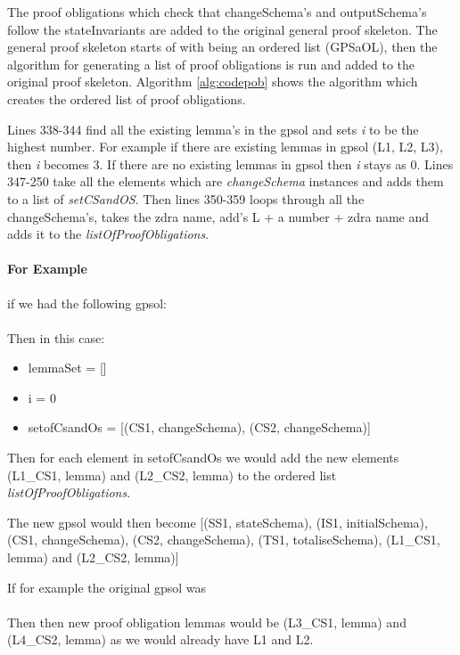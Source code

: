 The proof obligations which check that changeSchema's and outputSchema's follow the stateInvariants are added to the original general proof skeleton. The general proof skeleton starts of with being an ordered list (GPSaOL), then the algorithm for generating a list of proof obligations is run and added to the original proof skeleton. Algorithm \ref{alg:codepob} shows the algorithm which creates the ordered list of proof obligations.

Lines 338-344 find all the existing lemma's in the \gls{gpsol} and sets \emph{i} to be the highest number. For example if there are existing lemmas in \gls{gpsol} (L1, L2, L3), then \emph{i} becomes 3. If there are no existing lemmas in \gls{gpsol} then \emph{i} stays as 0. Lines 347-250 take all the elements which are \emph{changeSchema} instances and adds them to a list of \emph{setCSandOS}. Then lines 350-359 loops through all the changeSchema's, takes the \gls{zdra} name, add's L + a number + \gls{zdra} name and adds it to the \emph{listOfProofObligations}.

\paragraph{For Example}

if we had the following \gls{gpsol}: \\
 \\
Then in this case:
\begin{itemize}
\item lemmaSet = []
\item i = 0
\item setofCsandOs = [(CS1, changeSchema), (CS2, changeSchema)]
\end{itemize}

Then for each element in setofCsandOs we would add the new elements (L1\_CS1, lemma) and (L2\_CS2, lemma) to the ordered list \emph{listOfProofObligations}.

The new \gls{gpsol} would then become [(SS1, stateSchema), (IS1, initialSchema), (CS1, changeSchema), (CS2, changeSchema), (TS1, totaliseSchema), (L1\_CS1, lemma) and (L2\_CS2, lemma)]

If for example the original \gls{gpsol} was \\
\\
Then then new proof obligation lemmas would be (L3\_CS1, lemma) and (L4\_CS2, lemma) as we would already have L1 and L2.

